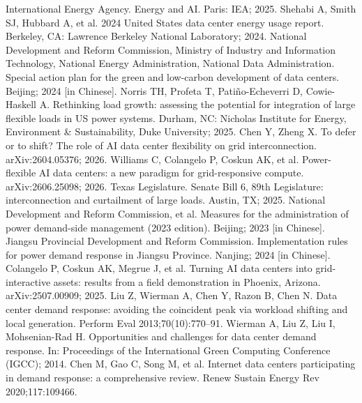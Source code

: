  International Energy Agency. Energy and AI. Paris: IEA; 2025.
 Shehabi A, Smith SJ, Hubbard A, et al. 2024 United States data center energy usage report. Berkeley, CA: Lawrence Berkeley National Laboratory; 2024.
 National Development and Reform Commission, Ministry of Industry and Information Technology, National Energy Administration, National Data Administration. Special action plan for the green and low-carbon development of data centers. Beijing; 2024 [in Chinese].
 Norris TH, Profeta T, Pati\~no-Echeverri D, Cowie-Haskell A. Rethinking load growth: assessing the potential for integration of large flexible loads in US power systems. Durham, NC: Nicholas Institute for Energy, Environment \& Sustainability, Duke University; 2025.
 Chen Y, Zheng X. To defer or to shift? The role of AI data center flexibility on grid interconnection. arXiv:2604.05376; 2026.
 Williams C, Colangelo P, Coskun AK, et al. Power-flexible AI data centers: a new paradigm for grid-responsive compute. arXiv:2606.25098; 2026.
 Texas Legislature. Senate Bill 6, 89th Legislature: interconnection and curtailment of large loads. Austin, TX; 2025.
 National Development and Reform Commission, et al. Measures for the administration of power demand-side management (2023 edition). Beijing; 2023 [in Chinese].
 Jiangsu Provincial Development and Reform Commission. Implementation rules for power demand response in Jiangsu Province. Nanjing; 2024 [in Chinese].
 Colangelo P, Coskun AK, Megrue J, et al. Turning AI data centers into grid-interactive assets: results from a field demonstration in Phoenix, Arizona. arXiv:2507.00909; 2025.
 Liu Z, Wierman A, Chen Y, Razon B, Chen N. Data center demand response: avoiding the coincident peak via workload shifting and local generation. Perform Eval 2013;70(10):770--91.
 Wierman A, Liu Z, Liu I, Mohsenian-Rad H. Opportunities and challenges for data center demand response. In: Proceedings of the International Green Computing Conference (IGCC); 2014.
 Chen M, Gao C, Song M, et al. Internet data centers participating in demand response: a comprehensive review. Renew Sustain Energy Rev 2020;117:109466.

